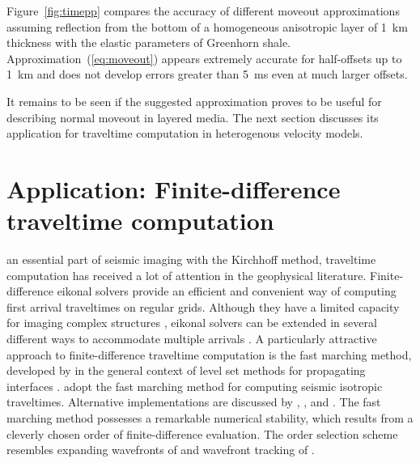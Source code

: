 Figure~\ref{fig:timepp} compares the accuracy of different moveout
approximations assuming reflection from the bottom of a homogeneous
anisotropic layer of 1~km thickness with the elastic parameters of Greenhorn
shale.  Approximation~(\ref{eq:moveout}) appears extremely accurate for
half-offsets up to 1~km and does not develop errors greater than 5~ms even
at much larger offsets.
  

It remains to be seen if the suggested approximation proves to be useful for
describing normal moveout in layered media. The next section discusses its
application for traveltime computation in heterogenous velocity models.

\section{Application: Finite-difference traveltime computation}

 an essential part of seismic imaging with the Kirchhoff method,
traveltime computation has received a lot of attention in the geophysical
literature.  Finite-difference eikonal solvers
\cite[]{GEO55-05-05210526,GEO56-06-08120821,podvin.gji.91} provide an efficient
and convenient way of computing first arrival traveltimes on regular grids.
Although they have a limited capacity for imaging complex structures
\cite[]{GEO58-04-05640575}, eikonal solvers can be extended in several different
ways to accommodate multiple arrivals
\cite[]{GEO62-02-05770588,SEG-1998-1945,GEO64-01-02300239}. A particularly
attractive approach to finite-difference traveltime computation is the fast
marching method, developed by \cite{paper} in the general context of level
set methods for propagating interfaces \cite[]{osher,book}.
\cite{GEO64-02-05160523} adopt the fast marching method for computing
seismic isotropic traveltimes. Alternative implementations are discussed by
\cite{SEG-1998-1949}, \cite{GPR49-02-01650178}, and \cite{kim}.
The fast marching method possesses a remarkable numerical stability, which
results from a cleverly chosen order of finite-difference evaluation.  The
order selection scheme resembles expanding wavefronts of
\cite{GEO57-03-04780487} and wavefront tracking of
\cite{GEO59-04-06320643}.

